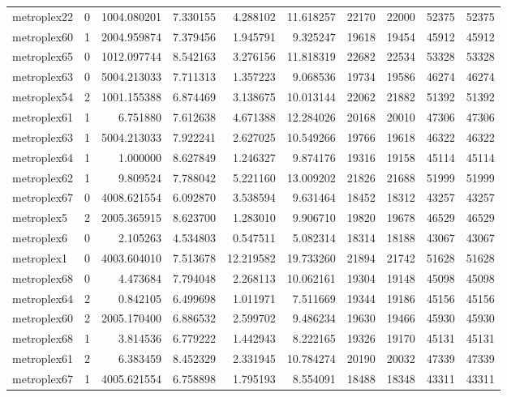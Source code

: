 \begin{longtable}{|l|r|r|r|r|r|r|r|r|r|}
metroplex22 & 0 & 1004.080201 & 7.330155 & 4.288102 & 11.618257 & 22170 & 22000 & 52375 & 52375 \\
metroplex60 & 1 & 2004.959874 & 7.379456 & 1.945791 & 9.325247 & 19618 & 19454 & 45912 & 45912 \\
metroplex65 & 0 & 1012.097744 & 8.542163 & 3.276156 & 11.818319 & 22682 & 22534 & 53328 & 53328 \\
metroplex63 & 0 & 5004.213033 & 7.711313 & 1.357223 & 9.068536 & 19734 & 19586 & 46274 & 46274 \\
metroplex54 & 2 & 1001.155388 & 6.874469 & 3.138675 & 10.013144 & 22062 & 21882 & 51392 & 51392 \\
metroplex61 & 1 & 6.751880 & 7.612638 & 4.671388 & 12.284026 & 20168 & 20010 & 47306 & 47306 \\
metroplex63 & 1 & 5004.213033 & 7.922241 & 2.627025 & 10.549266 & 19766 & 19618 & 46322 & 46322 \\
metroplex64 & 1 & 1.000000 & 8.627849 & 1.246327 & 9.874176 & 19316 & 19158 & 45114 & 45114 \\
metroplex62 & 1 & 9.809524 & 7.788042 & 5.221160 & 13.009202 & 21826 & 21688 & 51999 & 51999 \\
metroplex67 & 0 & 4008.621554 & 6.092870 & 3.538594 & 9.631464 & 18452 & 18312 & 43257 & 43257 \\
metroplex5 & 2 & 2005.365915 & 8.623700 & 1.283010 & 9.906710 & 19820 & 19678 & 46529 & 46529 \\
metroplex6 & 0 & 2.105263 & 4.534803 & 0.547511 & 5.082314 & 18314 & 18188 & 43067 & 43067 \\
metroplex1 & 0 & 4003.604010 & 7.513678 & 12.219582 & 19.733260 & 21894 & 21742 & 51628 & 51628 \\
metroplex68 & 0 & 4.473684 & 7.794048 & 2.268113 & 10.062161 & 19304 & 19148 & 45098 & 45098 \\
metroplex64 & 2 & 0.842105 & 6.499698 & 1.011971 & 7.511669 & 19344 & 19186 & 45156 & 45156 \\
metroplex60 & 2 & 2005.170400 & 6.886532 & 2.599702 & 9.486234 & 19630 & 19466 & 45930 & 45930 \\
metroplex68 & 1 & 3.814536 & 6.779222 & 1.442943 & 8.222165 & 19326 & 19170 & 45131 & 45131 \\
metroplex61 & 2 & 6.383459 & 8.452329 & 2.331945 & 10.784274 & 20190 & 20032 & 47339 & 47339 \\
metroplex67 & 1 & 4005.621554 & 6.758898 & 1.795193 & 8.554091 & 18488 & 18348 & 43311 & 43311 \\

\end{longtable}
